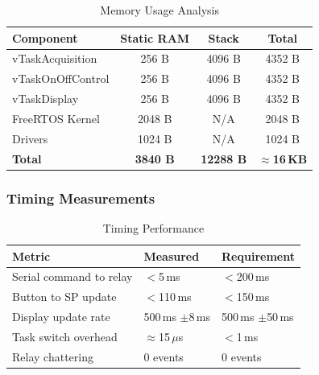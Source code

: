 \documentclass[12pt]{article}
\begin{document}
\begin{table}[H]
    \centering
    \caption{Memory Usage Analysis}
    \label{tab:memory-usage}
    \begin{tabular}{|l|c|c|c|}
        \hline
        \textbf{Component} & \textbf{Static RAM} & \textbf{Stack} & \textbf{Total} \\
        \hline
        vTaskAcquisition  & 256 B & 4096 B & 4352 B \\
        \hline
        vTaskOnOffControl & 256 B & 4096 B & 4352 B \\
        \hline
        vTaskDisplay      & 256 B & 4096 B & 4352 B \\
        \hline
        FreeRTOS Kernel   & 2048 B & N/A   & 2048 B \\
        \hline
        Drivers           & 1024 B & N/A   & 1024 B \\
        \hline
        \textbf{Total}    & \textbf{3840 B} & \textbf{12288 B} & \textbf{$\approx$16\,KB} \\
        \hline
    \end{tabular}
\end{table}

\subsubsection*{Timing Measurements}

\begin{table}[H]
    \centering
    \caption{Timing Performance}
    \label{tab:timing}
    \begin{tabular}{|l|l|l|}
        \hline
        \textbf{Metric} & \textbf{Measured} & \textbf{Requirement} \\
        \hline
        Serial command to relay & $<$5\,ms   & $<$200\,ms \\
        \hline
        Button to SP update     & $<$110\,ms & $<$150\,ms \\
        \hline
        Display update rate     & 500\,ms $\pm$8\,ms & 500\,ms $\pm$50\,ms \\
        \hline
        Task switch overhead    & $\approx$15\,$\mu$s & $<$1\,ms \\
        \hline
        Relay chattering        & 0 events   & 0 events \\
        \hline
    \end{tabular}
\end{table}

\end{document}
